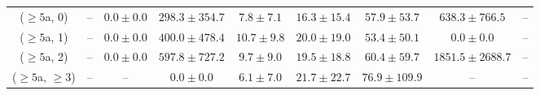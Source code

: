 \begin{table}[h!]
{\begin{tabular}{ccccccccc}
	($\ge5$a, 0) & -- & $0.0\pm 0.0$ & $298.3\pm 354.7$ & $7.8\pm 7.1$ & $16.3\pm 15.4$ & $57.9\pm 53.7$ & $638.3\pm 766.5$ & -- \\[0.5ex] 
	($\ge5$a, 1) & -- & $0.0\pm 0.0$ & $400.0\pm 478.4$ & $10.7\pm 9.8$ & $20.0\pm 19.0$ & $53.4\pm 50.1$ & $0.0\pm 0.0$ & -- \\[0.5ex] 
	($\ge5$a, 2) & -- & $0.0\pm 0.0$ & $597.8\pm 727.2$ & $9.7\pm 9.0$ & $19.5\pm 18.8$ & $60.4\pm 59.7$ & $1851.5\pm 2688.7$ & -- \\[0.5ex] 
	($\ge5$a, $\ge3$) & -- & -- & $0.0\pm 0.0$ & $6.1\pm 7.0$ & $21.7\pm 22.7$ & $76.9\pm 109.9$ & -- & -- \\[0.5ex] 
	\hline
	\hline
\end{tabular}}
\end{table}
